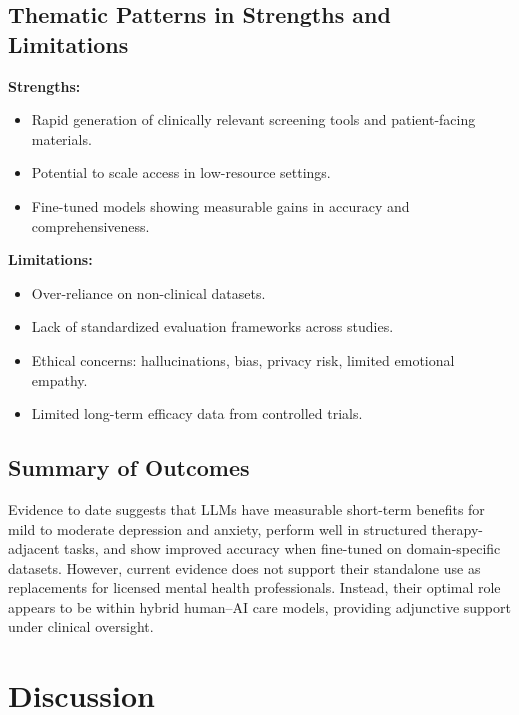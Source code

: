 \documentclass[journal]{IEEEtran}
\begin{document}
\subsection{Thematic Patterns in Strengths and Limitations}
\textbf{Strengths:}
\begin{itemize}
    \item Rapid generation of clinically relevant screening tools and patient-facing materials.
    \item Potential to scale access in low-resource settings.
    \item Fine-tuned models showing measurable gains in accuracy and comprehensiveness.
\end{itemize}

\textbf{Limitations:}
\begin{itemize}
    \item Over-reliance on non-clinical datasets.
    \item Lack of standardized evaluation frameworks across studies.
    \item Ethical concerns: hallucinations, bias, privacy risk, limited emotional empathy.
    \item Limited long-term efficacy data from controlled trials.
\end{itemize}

\subsection{Summary of Outcomes}
Evidence to date suggests that LLMs have measurable short-term benefits for mild to moderate depression and anxiety, perform well in structured therapy-adjacent tasks, and show improved accuracy when fine-tuned on domain-specific datasets.  
However, current evidence does not support their standalone use as replacements for licensed mental health professionals. Instead, their optimal role appears to be within hybrid human--AI care models, providing adjunctive support under clinical oversight.

\section{Discussion}
\end{document}
